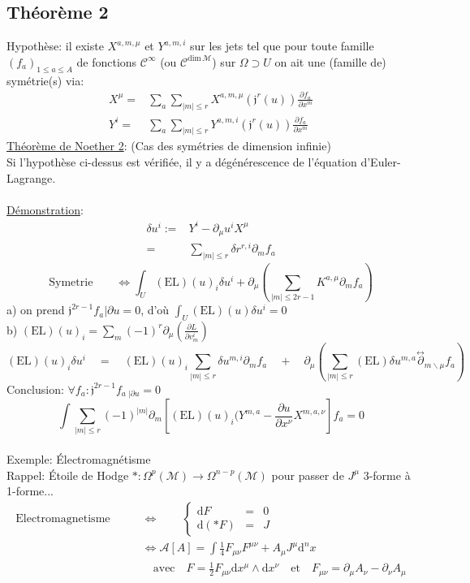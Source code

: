 \documentclass[a4paper,11pt]{article}
\renewcommand{\d}{{\mathrm{d}}}
\newcommand{\dr}[2]{\frac{\partial {#1}}{\partial{#2}}}
\begin{document}
\subsection{Théorème 2}
Hypothèse: il existe $X^{a,m,\mu}$ et $Y^{a,m,i}$ sur les jets tel que pour toute famille $(f_a)_{1\leq a \leq A}$ de fonctions $\mathcal{C}^\infty$ (ou $\mathcal{C}^{\mathrm{dim}\,\mathcal{M}}$) sur $\Omega\supset U$ on ait une (famille de) symétrie(s) via:
\begin{align*}
X^\mu =& \sum_a \sum_{|m|\leq r} X^{a,m,\mu}(\mathfrak{j}^r(u))\dr {f_a}{x^m}\\
Y^i =& \sum_a \sum_{|m|\leq r} Y^{a,m,i}(\mathfrak{j}^r(u))\dr {f_a}{x^m}
\end{align*}
\underline{Théorème de Noether 2}: (Cas des symétries de dimension infinie)\\
Si l'hypothèse ci-dessus est vérifiée, il y a dégénérescence de l'équation d'Euler-Lagrange.\\
\\
\underline{Démonstration}:
\begin{align*}
\delta u^i :=& Y^i - \partial_\mu u^i X^\mu\\
=& \sum_{|m|\leq r} \delta r ^{r,i} \partial_m f_a
\end{align*}
$$\mathrm{Symetrie} \quad \quad \iff \int_U (\mathrm{EL})(u)_i \delta u^i + \partial_\mu \left(\sum_{|m|\leq 2r-1} K^{a,\mu}\partial_m f_a\right)$$
a) on prend $\mathfrak{j}^{2r-1}f_a |{\partial u}=0$, d'où $\int_U (\mathrm{EL})(u)\delta u^i =0$\\
b) $(\mathrm{EL})(u)_i = \sum_m (-1)^r \partial_\mu (\dr L {v^i_m})$ 
$$(\mathrm{EL})(u)_i \delta u^i \quad = \quad (\mathrm{EL})(u)_i \sum_{|m|\leq r} \delta u^{m,i}\partial_m f_a \quad + \quad \partial_\mu \left(\sum_{|m|\leq r} (\mathrm{EL})\delta u^{m,a}\overset{\leftrightarrow}\partial_{m\backslash\mu} f_a\right)$$
Conclusion: $\forall f_a : \mathfrak{j}^{2r-1} f_a\,\!_{|\partial u} = 0$
$$\int \sum_{|m|\leq r} (-1)^{|m|}\partial_m\left[(\mathrm{EL})(u)_i (Y^{m,a} - \dr u{x^\nu} X^{m,a,\nu}\right] f_a = 0$$
\\
Exemple: Électromagnétisme\\
Rappel: Étoile de Hodge $* : \Omega^p(\mathcal{M})\to \Omega^{n-p}(\mathcal{M})$ pour passer de $J^\mu$ 3-forme à 1-forme...
\begin{align*}
\mathrm{Electromagnetisme} \quad \quad &\iff \quad \quad \left\{
\begin{matrix}\d F & = & 0\\ \d(*F) & = & J\end{matrix}\right.\\
& \iff \mathcal{A}[A] = \int \frac{1}{4}F_{\mu\nu}F^{\mu\nu} + A_\mu J^\mu \d^n x\\
& \quad \mathrm{avec} \quad F = \frac{1}{2} F_{\mu\nu}\d x^\mu \wedge \d x^\nu \quad \mathrm{et}\quad F_{\mu\nu}=\partial_\mu A_\nu - \partial_\nu A_\mu
\end{align*}
\end{document}

